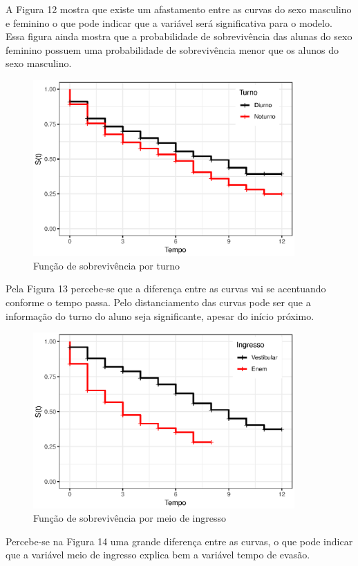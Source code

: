 \documentclass[a4paper,12pt]{article}
\begin{document}
A Figura 12 mostra que existe um afastamento entre as curvas do sexo masculino e feminino o que pode indicar que a variável será significativa para o modelo. Essa figura ainda mostra que a probabilidade de sobrevivência das alunas do sexo feminino possuem uma probabilidade de sobrevivência menor que os alunos do sexo masculino.

\begin{figure}[H]
\centering
\includegraphics[width=10cm]{exp_quim_turn}
\caption{Função de sobrevivência por turno}
\end{figure}

Pela Figura 13 percebe-se que a diferença entre as curvas vai se acentuando conforme o tempo passa. Pelo distanciamento das curvas pode ser que a informação do turno do aluno seja significante, apesar do início próximo.

\begin{figure}[H]
\centering
\includegraphics[width=10cm]{exp_quim_ing}
\caption{Função de sobrevivência por meio de ingresso}
\end{figure}

Percebe-se na Figura 14 uma grande diferença entre as curvas, o que pode indicar que a variável meio de ingresso explica bem a variável tempo de evasão.
\end{document}
